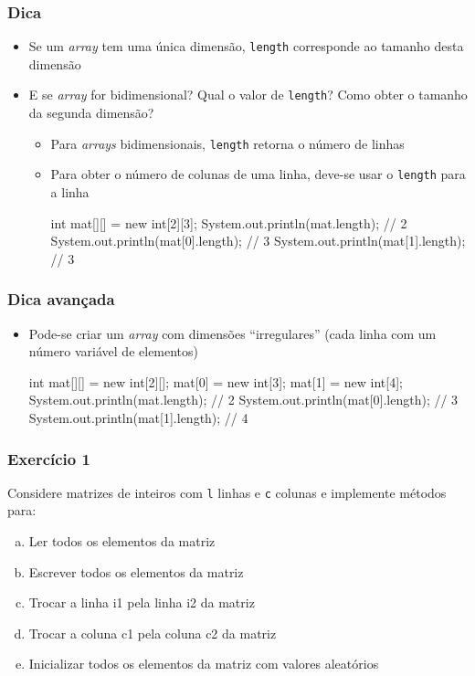 \documentclass[xcolor={dvipsnames,table},aspectratio=169]{beamer}
\begin{document}
\begin{frame}[fragile]	\frametitle{Dica}
\begin{itemize}
	\item Se um \emph{array} tem uma única dimensão, \texttt{length} corresponde ao tamanho desta dimensão
	\item E se \emph{array} for bidimensional? Qual o valor de \texttt{length}? Como obter o tamanho da segunda dimensão?
	\begin{itemize}
		\item Para \emph{arrays} bidimensionais, \texttt{length} retorna o número de linhas
		\item Para obter o número de colunas de uma linha, deve-se usar o \texttt{length} para a linha
{\scriptsize
\begin{javacode}
int mat[][] = new int[2][3];
System.out.println(mat.length);    // 2
System.out.println(mat[0].length); // 3
System.out.println(mat[1].length); // 3
\end{javacode}
}
	\end{itemize}
\end{itemize}
\end{frame}

\begin{frame}[fragile]\frametitle{Dica avançada}
\begin{itemize}
	\item Pode-se criar um \emph{array} com dimensões ``irregulares'' (cada linha com um número variável de elementos)
{\scriptsize
\begin{javacode}
int mat[][] = new int[2][];
mat[0] = new int[3];
mat[1] = new int[4];
System.out.println(mat.length);    // 2
System.out.println(mat[0].length); // 3
System.out.println(mat[1].length); // 4
\end{javacode}
}
\end{itemize}
\end{frame}

\begin{frame}\frametitle{Exercício 1}
Considere matrizes de inteiros com \texttt{l} linhas e \texttt{c} colunas e implemente métodos para:
\begin{enumerate}[a)]
	\item Ler todos os elementos da matriz
	\item Escrever todos os elementos da matriz
	\item Trocar a linha i1 pela linha i2 da matriz
	\item Trocar a coluna c1 pela coluna c2 da matriz
	\item Inicializar todos os elementos da matriz com valores aleatórios
\end{enumerate}
\end{frame}
\end{document}
